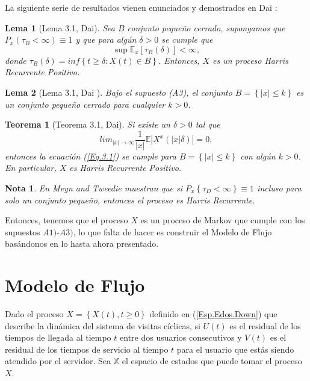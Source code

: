 \documentclass{article}
\newtheorem{Teo}{Teorema}
\newtheorem{Note}{Nota}
\newtheorem{Lema}{Lema}
\newcommand{\esp}{\mathbb{E}}
\begin{document}
La siguiente serie de resultados vienen enunciados y demostrados en Dai \cite{Dai}:
\begin{Lema}[Lema 3.1, Dai\cite{Dai}]
Sea $B$ conjunto peque\~no cerrado, supongamos que $P_{x}\left(\tau_{B}<\infty\right)\equiv1$ y que para alg\'un $\delta>0$ se cumple que
\begin{equation}\label{Eq.3.1}
\sup\esp_{x}\left[\tau_{B}\left(\delta\right)\right]<\infty,
\end{equation}
donde $\tau_{B}\left(\delta\right)=inf\left\{t\geq\delta:X\left(t\right)\in B\right\}$. Entonces, $X$ es un proceso Harris Recurrente Positivo.
\end{Lema}

\begin{Lema}[Lema 3.1, Dai \cite{Dai}]\label{Lema.3.}
Bajo el supuesto (A3), el conjunto $B=\left\{|x|\leq k\right\}$ es un conjunto peque\~no cerrado para cualquier $k>0$.
\end{Lema}

\begin{Teo}[Teorema 3.1, Dai\cite{Dai}]\label{Tma.3.1}
Si existe un $\delta>0$ tal que 
\begin{equation}
lim_{|x|\rightarrow\infty}\frac{1}{|x|}\esp|X^{x}\left(|x|\delta\right)|=0,
\end{equation}
entonces la ecuaci\'on (\ref{Eq.3.1}) se cumple para $B=\left\{|x|\leq k\right\}$ con alg\'un $k>0$. En particular, $X$ es Harris Recurrente Positivo.
\end{Teo}

\begin{Note}
En Meyn and Tweedie \cite{MeynTweedie} muestran que si $P_{x}\left\{\tau_{D}<\infty\right\}\equiv1$ incluso para solo un conjunto peque\~no, entonces el proceso es Harris Recurrente.
\end{Note}

Entonces, tenemos que el proceso $X$ es un proceso de Markov que cumple con los supuestos $A1)$-$A3)$, lo que falta de hacer es construir el Modelo de Flujo bas\'andonos en lo hasta ahora presentado.

\section{Modelo de Flujo}

Dado el proceso $X=\left\{X\left(t\right),t\geq0\right\}$ definido
en (\ref{Esp.Edos.Down}) que describe la din\'amica del sistema de
visitas c\'iclicas, si $U\left(t\right)$ es el residual de los
tiempos de llegada al tiempo $t$ entre dos usuarios consecutivos y
$V\left(t\right)$ es el residual de los tiempos de servicio al
tiempo $t$ para el usuario que est\'as siendo atendido por el
servidor. Sea $\mathbb{X}$ el espacio de estados que puede tomar
el proceso $X$.
\end{document}
